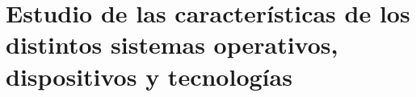 \section{Estudio de las características de los distintos sistemas operativos, dispositivos y tecnologías}
\label{sec:analisis_estudio}


